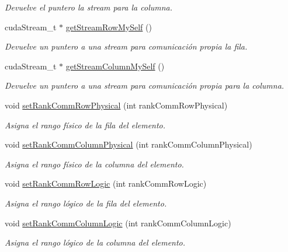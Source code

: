 \begin{DoxyCompactItemize}
\begin{DoxyCompactList}\small\item\em Devuelve el puntero la stream para la columna. \end{DoxyCompactList}\item 
cuda\+Stream\+\_\+t $\ast$ \hyperlink{classCommSummaElement_ae777b3cbe1840c0cf82bb082240617d1}{get\+Stream\+Row\+My\+Self} ()
\begin{DoxyCompactList}\small\item\em Devuelve un puntero a una stream para comunicación propia la fila. \end{DoxyCompactList}\item 
cuda\+Stream\+\_\+t $\ast$ \hyperlink{classCommSummaElement_a0d766583f40c08ada84d080f7d8f83ea}{get\+Stream\+Column\+My\+Self} ()
\begin{DoxyCompactList}\small\item\em Devuelve un puntero a una stream para comunicación propia para la columna. \end{DoxyCompactList}\item 
void \hyperlink{classCommSummaElement_ac53991daf63f3bec0b4954b62f724391}{set\+Rank\+Comm\+Row\+Physical} (int rank\+Comm\+Row\+Physical)
\begin{DoxyCompactList}\small\item\em Asigna el rango físico de la fila del elemento. \end{DoxyCompactList}\item 
void \hyperlink{classCommSummaElement_a01ee2b0f2e505649f8c23d5a7350716e}{set\+Rank\+Comm\+Column\+Physical} (int rank\+Comm\+Column\+Physical)
\begin{DoxyCompactList}\small\item\em Asigna el rango físico de la columna del elemento. \end{DoxyCompactList}\item 
void \hyperlink{classCommSummaElement_a58b5b4178d7ab6adf58c6e864a0dbfff}{set\+Rank\+Comm\+Row\+Logic} (int rank\+Comm\+Row\+Logic)
\begin{DoxyCompactList}\small\item\em Asigna el rango lógico de la fila del elemento. \end{DoxyCompactList}\item 
void \hyperlink{classCommSummaElement_a12f2823f399c319f8edfaa7ab29f1527}{set\+Rank\+Comm\+Column\+Logic} (int rank\+Comm\+Column\+Logic)
\begin{DoxyCompactList}\small\item\em Asigna el rango lógico de la columna del elemento. \end{DoxyCompactList}\item 

\end{DoxyCompactItemize}
